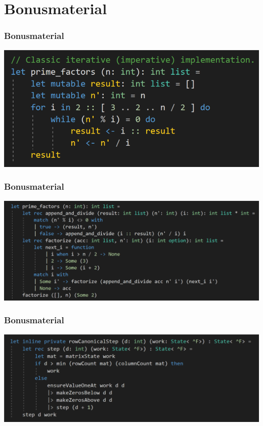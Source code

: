 \documentclass{beamer}
\begin{document}
\section{Bonusmaterial}

\begin{frame}
    \frametitle{Bonusmaterial}
    \begin{center}
        \includegraphics[scale=0.3]{naiv.png}
    \end{center}
\end{frame}

\begin{frame}
    \frametitle{Bonusmaterial}
    \begin{center}
            \includegraphics[scale=0.225]{primfaktorzerlegung_funktional.png}
    \end{center}
\end{frame}

\begin{frame}
    \frametitle{Bonusmaterial}
    \begin{center}
        \includegraphics[scale=0.25]{funktionskomposition}
    \end{center}
\end{frame}
\end{document}
